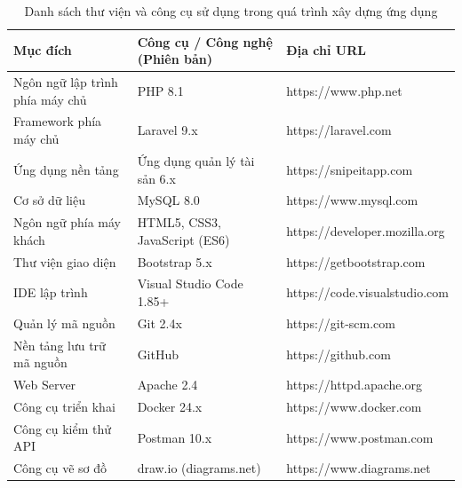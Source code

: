 \documentclass[../DoAn.tex]{subfiles}
\begin{document}
\begin{table}[H]
\centering
\renewcommand{\arraystretch}{1.3}
\begin{tabular}{p{4cm} p{6cm} p{4.5cm}}
\hline
\textbf{Mục đích} & \textbf{Công cụ / Công nghệ (Phiên bản)} & \textbf{Địa chỉ URL} \\ \hline

Ngôn ngữ lập trình phía máy chủ 
& PHP 8.1 
& https://www.php.net \\ \hline

Framework phía máy chủ 
& Laravel 9.x 
& https://laravel.com \\ \hline

Ứng dụng nền tảng 
& Ứng dụng quản lý tài sản 6.x 
& https://snipeitapp.com \\ \hline

Cơ sở dữ liệu 
& MySQL 8.0 
& https://www.mysql.com \\ \hline

Ngôn ngữ phía máy khách 
& HTML5, CSS3, JavaScript (ES6) 
& https://developer.mozilla.org \\ \hline

Thư viện giao diện 
& Bootstrap 5.x 
& https://getbootstrap.com \\ \hline

IDE lập trình 
& Visual Studio Code 1.85+ 
& https://code.visualstudio.com \\ \hline

Quản lý mã nguồn 
& Git 2.4x 
& https://git-scm.com \\ \hline

Nền tảng lưu trữ mã nguồn 
& GitHub 
& https://github.com \\ \hline

Web Server 
& Apache 2.4 
& https://httpd.apache.org \\ \hline

Công cụ triển khai 
& Docker 24.x 
& https://www.docker.com \\ \hline

Công cụ kiểm thử API 
& Postman 10.x 
& https://www.postman.com \\ \hline

Công cụ vẽ sơ đồ 
& draw.io (diagrams.net) 
& https://www.diagrams.net \\ \hline

\end{tabular}
\caption{Danh sách thư viện và công cụ sử dụng trong quá trình xây dựng ứng dụng}
\label{table:tools}
\end{table}
\end{document}
